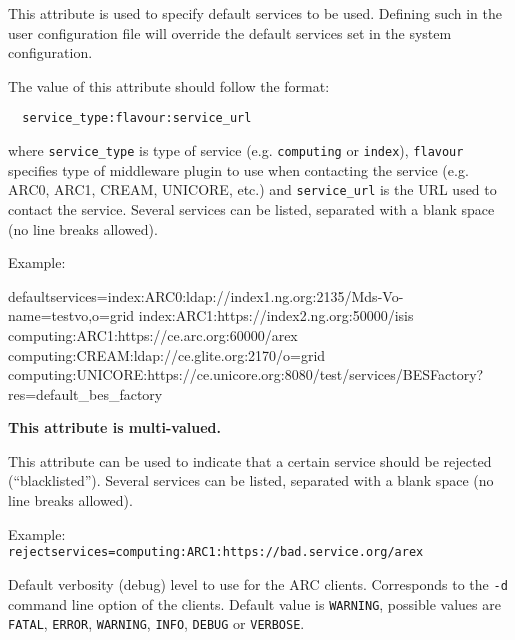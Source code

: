 This attribute is used to specify default services to be used. Defining such in
the user configuration file will override the default services set in the system
configuration.

The value of this attribute should follow the format:
\begin{verbatim}
  service_type:flavour:service_url
\end{verbatim}

where \texttt{service\_type} is type of service (e.g. \texttt{computing} or
\texttt{index}), \texttt{flavour} specifies type of middleware plugin to use
when contacting the service (e.g. ARC0, ARC1, CREAM, UNICORE, etc.) and
\texttt{service\_url} is the URL used to contact the service. Several services
can be listed, separated with a blank space (no line breaks allowed).

Example:
\begin{verbatim*} 
defaultservices=index:ARC0:ldap://index1.ng.org:2135/Mds-Vo-name=testvo,o=grid
 index:ARC1:https://index2.ng.org:50000/isis
 computing:ARC1:https://ce.arc.org:60000/arex
 computing:CREAM:ldap://ce.glite.org:2170/o=grid
 computing:UNICORE:https://ce.unicore.org:8080/test/services/BESFactory?res=default_bes_factory
\end{verbatim*}

{}
\hspace*{0.5cm}
\begin{shaded}
\end{shaded}
\textbf{This attribute is multi-valued.}

This attribute can be used to indicate that a certain service should be
rejected (``blacklisted''). Several services can be listed, separated with a
blank space (no line breaks allowed).

Example:
\verb#    rejectservices=computing:ARC1:https://bad.service.org/arex#


 \hspace*{0.5cm}
 \begin{shaded}
 \end{shaded}
 Default verbosity (debug) level to use for the ARC clients. Corresponds to the
\verb#-d# command line option of the clients. Default value is \texttt{WARNING},
possible values are \texttt{FATAL}, \texttt{ERROR}, \texttt{WARNING},
\texttt{INFO}, \texttt{DEBUG} or \texttt{VERBOSE}.
 
